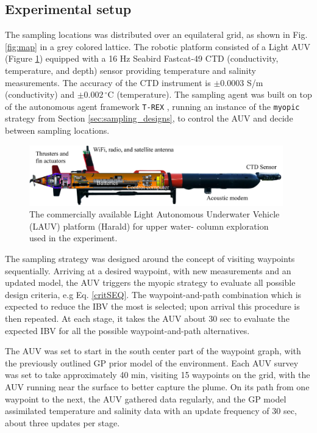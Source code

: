 \documentclass[aoas]{imsart}
\begin{document}
\subsection{Experimental setup}

The sampling locations was distributed over an equilateral grid, as shown in Fig. \ref{fig:map} in a grey colored lattice. The robotic platform consisted of a Light AUV \citep{sousa2012lauv} (Figure \ref{fig:lauv}) equipped with a 16 Hz Seabird Fastcat-49 CTD (conductivity, temperature, and depth) sensor providing temperature and salinity measurements. The accuracy of the CTD instrument is $\pm 0.0003$ S/m (conductivity) and $\pm0.002\,^{\circ}\mathrm{C}$ (temperature). The sampling agent was built on top of the autonomous agent framework \texttt{T-REX} \citep{py10,Rajan12,Rajan12b}, running an instance of the \texttt{myopic} strategy from Section \ref{sec:sampling_designs}, to control the AUV and decide between sampling locations.

\begin{figure}[!h] 
\centering 
\includegraphics[width=0.98\textwidth]{Figures/harald.jpg}
\caption{The commercially available Light Autonomous Underwater Vehicle (LAUV) platform (Harald) for upper water-
column exploration used in the experiment.}
\label{fig:lauv}
\end{figure} 

The sampling strategy was designed around the concept of visiting waypoints sequentially. Arriving at a desired waypoint, with new measurements and an updated model, the AUV triggers the myopic strategy to evaluate all possible design criteria, e.g Eq. \eqref{critSEQ}. The waypoint-and-path combination which is expected to reduce the IBV the most is selected; upon arrival this procedure is then repeated. At each stage, it takes the AUV about 30 sec to evaluate the expected IBV for all the possible waypoint-and-path alternatives.

The AUV was set to start in the south center part of the waypoint graph, with the previously outlined GP prior model of the environment. Each AUV survey was set to take approximately 40 min, visiting 15 waypoints on the grid, with the AUV running near the surface to better capture the plume. On its path from one waypoint to the next, the AUV gathered data regularly, and the GP model assimilated temperature and salinity data with an update frequency of 30 sec, about three updates per stage.
\end{document}

